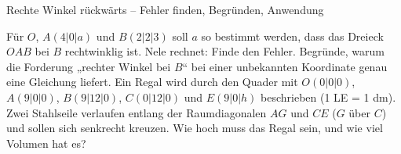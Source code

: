 \begin{aufgabe}{Rechte Winkel rückwärts – Fehler finden, Begründen, Anwendung}
\begin{teile}
\teil Für $O$, $A(4 | 0 | a)$ und $B(2 | 2 | 3)$ soll $a$ so bestimmt werden, dass das Dreieck $OAB$ bei $B$ rechtwinklig ist. Nele rechnet:  Finde den Fehler.
\teil Begründe, warum die Forderung „rechter Winkel bei $B$“ bei einer unbekannten Koordinate genau eine Gleichung liefert.
\teil Ein Regal wird durch den Quader mit $O(0 | 0 | 0)$, $A(9 | 0 | 0)$, $B(9 | 12 | 0)$, $C(0 | 12 | 0)$ und $E(9 | 0 | h)$ beschrieben (1 LE = 1 dm). Zwei Stahlseile verlaufen entlang der Raumdiagonalen $AG$ und $CE$ ($G$ über $C$) und sollen sich senkrecht kreuzen. Wie hoch muss das Regal sein, und wie viel Volumen hat es?
\end{teile}
\end{aufgabe}
